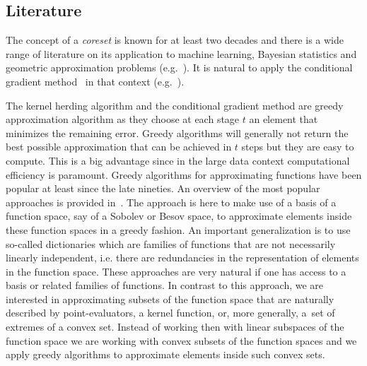 \documentclass[10pt]{amsart}
\theoremstyle{definition}\newtheorem{defi}[theo]{Definition}\newtheorem{rema}[theo]{Remark}\newtheorem{exam}[theo]{Example}\newtheorem{exem}[theo]{Example}\newtheorem{nota}[theo]{Notation}
\theoremstyle{remark}
\newcounter{setofstep}
\newcounter{step}[setofstep]
\begin{document}
\subsection{Literature} \label{sec:literature}
The concept of a \emph{coreset} is known for at least two decades and there is a wide range of literature on its application to machine learning, Bayesian statistics and geometric approximation problems (e.g.~\cite{AGAR05,BAD02,HUG16}). It is natural to apply the conditional gradient method~\cite{FW56} in that context (e.g.~\cite{HUG16}).

The kernel herding algorithm and the conditional gradient method are greedy approximation algorithm as they choose at each stage $t$ an element that minimizes the remaining error. Greedy algorithms will generally not return the best possible approximation that can be achieved in $t$ steps but they are easy to compute. This is a big advantage since in the large data context computational efficiency is paramount. Greedy algorithms for approximating functions have been popular at least since the late nineties. An overview of the most popular approaches is provided in~\cite{TEMLY11}. The approach is here to make use of a basis of a function space, say of a Sobolev or Besov space, to approximate elements inside these function spaces in a greedy fashion. An important generalization is to use so-called dictionaries which are families of functions that are not necessarily linearly independent, i.e. there are redundancies in the representation of elements in the function space. These approaches are very natural if one has access to a basis or related families of functions. In contrast to this approach, we are interested in approximating subsets of the function space that are naturally described by point-evaluators, a kernel function, or, more generally, a~set of extremes of a convex set. Instead of working then with linear subspaces of the function space we are working with convex subsets of the function spaces and we apply greedy algorithms to approximate elements inside such convex sets.
\end{document}
